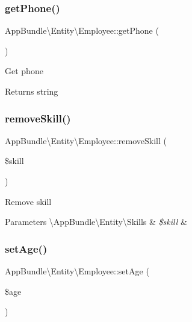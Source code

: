 \subsubsection{\texorpdfstring{get\+Phone()}{getPhone()}}
{\footnotesize\ttfamily App\+Bundle\textbackslash{}\+Entity\textbackslash{}\+Employee\+::get\+Phone (\begin{DoxyParamCaption}{ }\end{DoxyParamCaption})}

Get phone

\begin{DoxyReturn}{Returns}
string 
\end{DoxyReturn}
\mbox{\label{class_app_bundle_1_1_entity_1_1_employee_a69717b66303d554ad4c4297c147ad01d}} 
\subsubsection{\texorpdfstring{remove\+Skill()}{removeSkill()}}
{\footnotesize\ttfamily App\+Bundle\textbackslash{}\+Entity\textbackslash{}\+Employee\+::remove\+Skill (\begin{DoxyParamCaption}\item[{\textbackslash{}App\+Bundle\textbackslash{}\+Entity\textbackslash{}\+Skills}]{\$skill }\end{DoxyParamCaption})}

Remove skill


\begin{DoxyParams}[1]{Parameters}
\textbackslash{}\+App\+Bundle\textbackslash{}\+Entity\textbackslash{}\+Skills & {\em \$skill} & \\
\hline
\end{DoxyParams}
\mbox{\label{class_app_bundle_1_1_entity_1_1_employee_a1eaa0241464490a7b907de2b86ccee0e}} 
\subsubsection{\texorpdfstring{set\+Age()}{setAge()}}
{\footnotesize\ttfamily App\+Bundle\textbackslash{}\+Entity\textbackslash{}\+Employee\+::set\+Age (\begin{DoxyParamCaption}\item[{}]{\$age }\end{DoxyParamCaption})}

